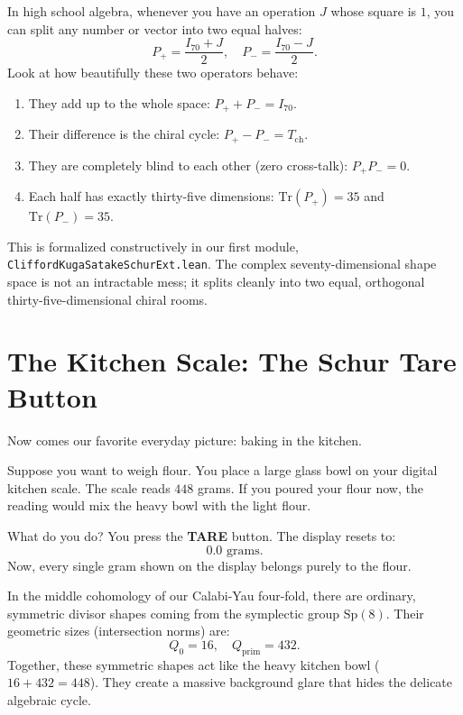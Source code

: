 \documentclass[11pt,a4paper]{article}
\theoremstyle{definition}
\begin{document}
In high school algebra, whenever you have an operation $J$ whose square is $1$, you can split any number or vector into two equal halves:
\begin{equation}
P_+ = \frac{I_{70} + J}{2}, \quad P_- = \frac{I_{70} - J}{2}.
\end{equation}
Look at how beautifully these two operators behave:
\begin{enumerate}
  \item They add up to the whole space: $P_+ + P_- = I_{70}$.
  \item Their difference is the chiral cycle: $P_+ - P_- = T_{\mathrm{ch}}$.
  \item They are completely blind to each other (zero cross-talk): $P_+ P_- = 0$.
  \item Each half has exactly thirty-five dimensions: $\mathrm{Tr}(P_+) = 35$ and $\mathrm{Tr}(P_-) = 35$.
\end{enumerate}
This is formalized constructively in our first module, \texttt{CliffordKugaSatakeSchurExt.lean}. The complex seventy-dimensional shape space is not an intractable mess; it splits cleanly into two equal, orthogonal thirty-five-dimensional chiral rooms.

\section{The Kitchen Scale: The Schur Tare Button}

Now comes our favorite everyday picture: baking in the kitchen.

Suppose you want to weigh flour. You place a large glass bowl on your digital kitchen scale. The scale reads $448$ grams. If you poured your flour now, the reading would mix the heavy bowl with the light flour.

What do you do? You press the \textbf{TARE} button. The display resets to:
\begin{equation}
0.0\text{ grams}.
\end{equation}
Now, every single gram shown on the display belongs purely to the flour.

In the middle cohomology of our Calabi-Yau four-fold, there are ordinary, symmetric divisor shapes coming from the symplectic group $\mathrm{Sp}(8)$. Their geometric sizes (intersection norms) are:
\begin{equation}
Q_0 = 16, \quad Q_{\mathrm{prim}} = 432.
\end{equation}
Together, these symmetric shapes act like the heavy kitchen bowl ($16 + 432 = 448$). They create a massive background glare that hides the delicate algebraic cycle.
\end{document}
